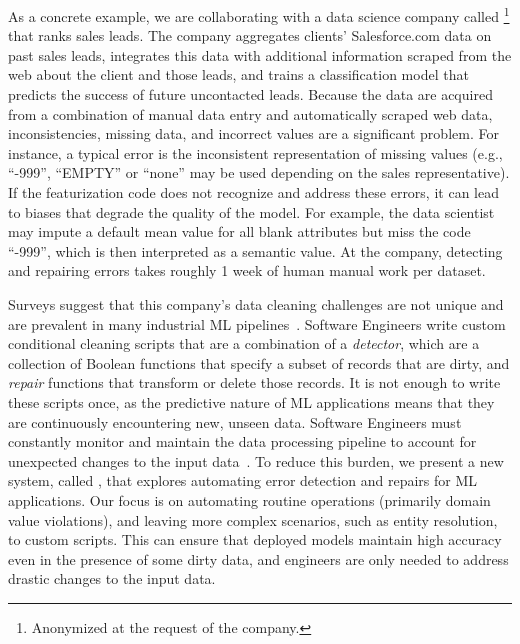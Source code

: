 As a concrete example, we are collaborating with a data science company called \company\footnote{Anonymized at the request of the company.} that ranks sales leads. The company aggregates clients' Salesforce.com data on past sales leads, integrates this data with additional information scraped from the web about the client and those leads, and trains a classification model that predicts the success of future uncontacted leads.  Because the data are acquired from a combination of manual data entry and automatically scraped web data, inconsistencies, missing data, and incorrect values are a significant problem.  For instance, a typical error is the inconsistent representation of missing values (e.g., ``-999'', ``EMPTY'' or ``none'' may be used depending on the sales representative).  If the featurization code does not recognize and address these errors, it can lead to biases that degrade the quality of the model. For example, the data scientist may impute a default mean value for all blank attributes but miss the code ``-999'', which is then interpreted as a semantic value. 
At the company, detecting and repairing errors takes roughly 1 week of human manual work per dataset. 

Surveys suggest that this company's data cleaning challenges are not unique and are prevalent in many industrial ML pipelines~\cite{krishnan2016hilda}.  
Software Engineers write custom conditional cleaning scripts that are a combination of a {\it detector}, which are a collection of Boolean functions that specify a subset of records that are dirty, and {\it repair} functions that transform or delete those records.  It is not enough to write these scripts once, as the predictive nature of ML applications means that they are continuously encountering new, unseen data.
Software Engineers must constantly monitor and maintain the data processing pipeline to account for unexpected changes to the input data~\cite{sculley2014machine, DBLP:conf/sigmod/KrishnanFGWW16}.
To reduce this burden, we present a new system, called \sys, that explores automating error detection and repairs for ML applications.   
Our focus is on automating routine operations (primarily domain value violations), and leaving more complex scenarios, such as entity resolution, to custom scripts.
This can ensure that deployed models maintain high accuracy even in the presence of some dirty data, and engineers are only needed to address drastic changes to the input data. 

